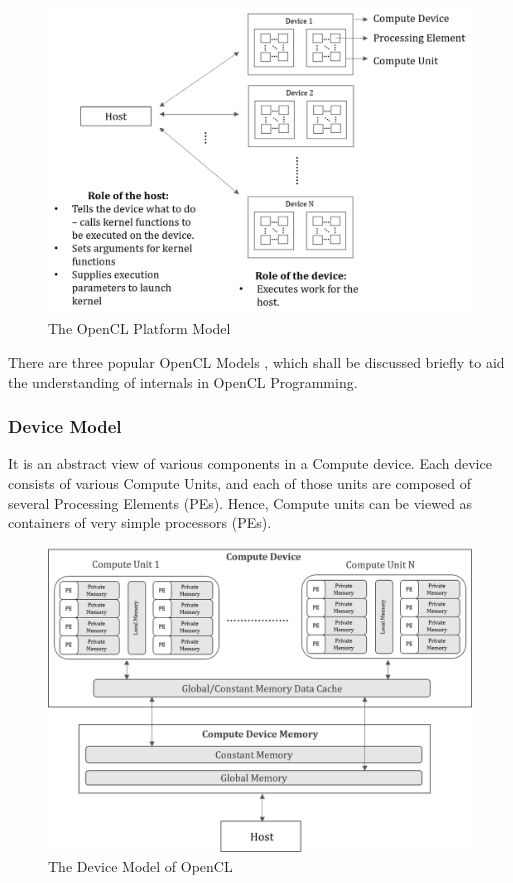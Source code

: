 \begin{figure}[h!]
  \includegraphics[width=\linewidth]{figures/openCL_architcture.png}
  \caption{The OpenCL Platform Model
  \cite{rosenberg2011opencl}}
  \label{fig:openCL_architecture}
\end{figure}

There are three popular OpenCL Models \cite{opencl_ajg}, which shall be discussed briefly to aid the understanding of internals in OpenCL Programming. 
\subsubsection{Device Model}
\label{2_3_1_1}
It is an abstract view of various components in a Compute device. 
Each device consists of various Compute Units, and each of those units are composed of several Processing Elements (PEs). 
Hence, Compute units can be viewed as containers of very simple processors (PEs). 

\begin{figure}[h!]
  \centering
  \includegraphics[width=0.80\linewidth]{figures/openCL_deviceModel.png}
  \caption{The Device Model of OpenCL
  \cite{opencl_ajg}}
  \label{fig:openCL_deviceModel}
\end{figure}

